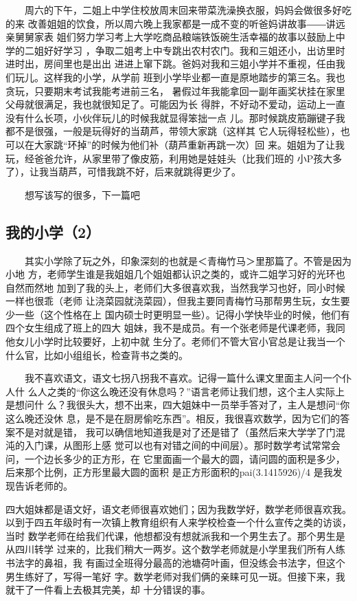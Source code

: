 \documentclass[12pt]{book}
\begin{document}
　　周六的下午，二姐上中学住校放周末回来带菜洗澡换衣服，妈妈会做很多好吃的来
改善姐姐的饮食，所以周六晚上我家都是一成不变的听爸妈讲故事――讲远亲舅舅家表
姐们努力学习考上大学吃商品粮端铁饭碗生活幸福的故事以鼓励上中学的二姐好好学习
，争取二姐考上中专跳出农村农门。我和三姐还小，出访里时进时出，房间里也是出出
进进上窜下跳。爸妈对我和三姐小学并不重视，任由我们玩儿。这样我的小学，从学前
班到小学毕业都一直是原地踏步的第三名。我也贪玩，只要期末考试我能考进前三名，
暑假过年我能拿回一副年画奖状挂在家里父母就很满足，我也就很知足了。可能因为长
得胖，不好动不爱动，运动上一直没有什么长项，小伙伴玩儿的时候我就显得笨拙一点
儿。那时候跳皮筋蹦键子我都不是很强，一般是玩得好的当葫芦，带领大家跳（这样其
它人玩得轻松些），也可以在大家跳“环掉”的时候为他们补（葫芦重新再跳一次）回
来。姐姐为了让我玩，经爸爸允许，从家里带了像皮筋，利用她是娃娃头（比我们班的
小P孩大多了），让我当葫芦，可惜我跳不好，后来就跳得更少了。

　　想写该写的很多，下一篇吧
\subsection{我的小学（2）}
\label{sec-2-2-2}

　　其实小学除了玩之外，印象深刻的也就是＜青梅竹马＞里那篇了。不管是因为小地
方，老师学生谁是我姐姐几个姐姐都认识之类的，或许二姐学习好的光环也自然而然地
加到了我的头上，老师们大多很喜欢我，当然我学习也好，同小时候一样也很乖（老师
让浇菜园就浇菜园），但我主要同青梅竹马那帮男生玩，女生要少一些（这个性格在上
国内硕士时更明显一些）。记得小学快毕业的时候，他们有四个女生组成了班上的四大
姐妹，我不是成员。有一个张老师是代课老师，我同他女儿小学时比较要好，上初中就
生分了。老师们不管大官小官总是让我当一个什么官，比如小组组长，检查背书之类的。

　　我不喜欢语文，语文七拐八拐我不喜欢。记得一篇什么课文里面主人问一个仆人什
么人之类的“你这么晚还没有休息吗？”语言老师让我们想，这个主人实际上是想问什
么？我很头大，想不出来，四大姐妹中一员举手答对了，主人是想问“你这么晚还没休
息，是不是在厨房偷吃东西”。相反，我很喜欢数学，因为它们的答案不是对就是错，
我可以确信地知道我是对了还是错了（虽然后来大学学了门混沌的入门课，从图形上感
觉可以也有对错之间的中间层）。那时数学考试常常会问，一个边长多少的正方形，在
它里面画一个最大的圆，请问圆的面积是多少，后来那个比例，正方形里最大圆的面积
是正方形面积的pai(3.1415926)/4 是我发现告诉老师的。

    四大姐妹都是语文好，语文老师很喜欢她们；因为我数学好，数学老师很喜欢我。
以到于四五年级时有一次镇上教育组织有人来学校检查一个什么宣传之类的访谈，当时
数学老师在给我们代课，他想都没有想就派我和一个男生去了。那个男生是从四川转学
过来的，比我们稍大一两岁。这个数学老师就是小学里我们所有人练书法字的鼻祖，我
有画过全班得分最高的池塘荷叶画，但没练会书法字，但这个男生练好了，写得一笔好
字。数学老师对我们俩的亲睐可见一斑。但接下来，我就干了一件看上去极其完美，却
十分错误的事。
\end{document}
